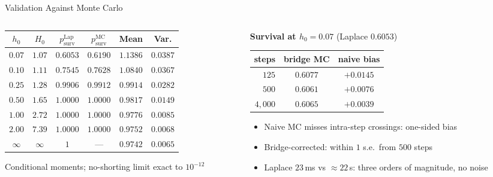 \documentclass[aspectratio=169,10pt]{beamer}
\newcommand{\surv}{p_{\mathrm{surv}}}
\begin{document}
\begin{frame}{Validation Against Monte Carlo}
  \scriptsize
  \begin{columns}[T]
    \begin{column}{0.56\linewidth}
      \begin{tabular}{cc cc cc}
      \toprule
      $h_0$ & $H_0$ & $\surv^{\mathrm{Lap}}$ & $\surv^{\mathrm{MC}}$ & Mean & Var. \\
      \midrule
      $0.07$ & $1.07$ & $0.6053$ & $0.6190$ & $1.1386$ & $0.0387$ \\
      $0.10$ & $1.11$ & $0.7545$ & $0.7628$ & $1.0840$ & $0.0367$ \\
      $0.25$ & $1.28$ & $0.9906$ & $0.9912$ & $0.9914$ & $0.0282$ \\
      $0.50$ & $1.65$ & $1.0000$ & $1.0000$ & $0.9817$ & $0.0149$ \\
      $1.00$ & $2.72$ & $1.0000$ & $1.0000$ & $0.9776$ & $0.0085$ \\
      $2.00$ & $7.39$ & $1.0000$ & $1.0000$ & $0.9752$ & $0.0068$ \\
      \midrule
      $\infty$ & $\infty$ & $1$ & --- & $0.9742$ & $0.0065$ \\
      \bottomrule
      \end{tabular}
      \vspace{0.3em}

      Conditional moments; no-shorting limit exact to $10^{-12}$
    \end{column}
    \begin{column}{0.42\linewidth}
      \textbf{Survival at $h_0=0.07$} (Laplace $0.6053$)
      \vspace{0.2em}

      \begin{tabular}{rcc}
      \toprule
      steps & bridge MC & naive bias \\
      \midrule
      $125$ & $0.6077$ & $+0.0145$ \\
      $500$ & $0.6061$ & $+0.0076$ \\
      $4{,}000$ & $0.6065$ & $+0.0039$ \\
      \bottomrule
      \end{tabular}
      \vspace{0.4em}

      \begin{itemize}
        \item Naive MC misses intra-step crossings: one-sided bias
        \item Bridge-corrected: within $1$ s.e.\ from $500$ steps
        \item Laplace $23$\,ms vs $\approx22$\,s: \alert{three orders of magnitude}, no noise
      \end{itemize}
    \end{column}
  \end{columns}
\end{frame}
\end{document}
